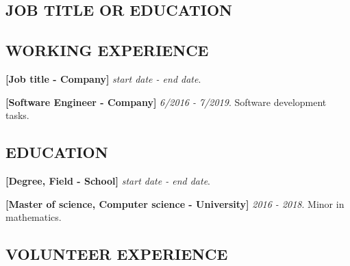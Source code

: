 \documentclass[a4paper, 12pt]{report}
\newlength{\boxedtextwidth}
\newenvironment*{framed}
{\begin{center}\begin{lrbox}{\framedbox}\begin{minipage}{\boxedtextwidth}
 \setlength{\parskip}{4.5pt plus 2pt minus 1pt}}
{\end{minipage}\end{lrbox}\fbox{\usebox{\framedbox}}\end{center}}
\newenvironment{righttext}{
\qquad\begin{minipage}[t]{0.6\textwidth}
}
{
\end{minipage}
}
\newcommand\work[4]
{
\item \textbf{[#1 - #2]} \emph{#3 - #4}. 
}
\newcommand\edu[5]
{
\item \textbf{[#1, #2 - #3]} \emph{#4 - #5}. 
}
\begin{document}
    \begin{righttext}
        \subsection*{JOB TITLE OR EDUCATION}
        \lipsum[1][1-5]
        \subsection*{WORKING EXPERIENCE}
            \begin{framed}
                \begin{workexp}
                    \work{Job title}{Company}{start date}{end date} \lipsum[2][1-2]
                    \work{Software Engineer}{Company}{6/2016}{7/2019} Software development tasks.
                \end{workexp}
            \end{framed}
        \subsection*{EDUCATION}
        \begin{framed}
            \begin{education}
                \edu{Degree}{Field}{School}{start date}{end date} \lipsum[3][1-2]
                \edu{Master of science}{Computer science}{University}{2016}{2018} Minor in mathematics.
            \end{education}
        \end{framed}
        \subsection*{VOLUNTEER EXPERIENCE}
        \lipsum[4][1-4]
    \end{righttext}
\end{document}
